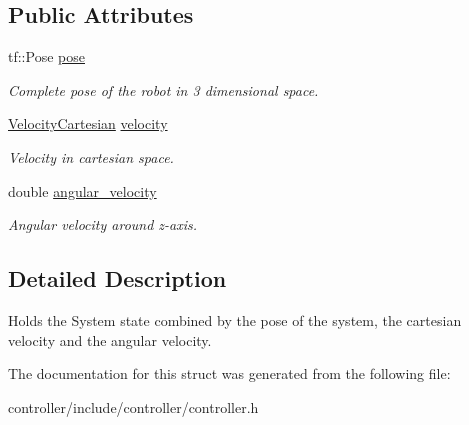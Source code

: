 \subsection*{Public Attributes}
\begin{DoxyCompactItemize}
\item 
tf\+::\+Pose \hyperlink{structController_1_1ControlState_a7c5ccd93c34234a339675a8882007972}{pose}\hypertarget{structController_1_1ControlState_a7c5ccd93c34234a339675a8882007972}{}\label{structController_1_1ControlState_a7c5ccd93c34234a339675a8882007972}

\begin{DoxyCompactList}\small\item\em Complete pose of the robot in 3 dimensional space. \end{DoxyCompactList}\item 
\hyperlink{classController_a7ab3d947ee649f6bac652de6a00e8148}{Velocity\+Cartesian} \hyperlink{structController_1_1ControlState_a3555392a901189a545630300a7b71e67}{velocity}\hypertarget{structController_1_1ControlState_a3555392a901189a545630300a7b71e67}{}\label{structController_1_1ControlState_a3555392a901189a545630300a7b71e67}

\begin{DoxyCompactList}\small\item\em Velocity in cartesian space. \end{DoxyCompactList}\item 
double \hyperlink{structController_1_1ControlState_acb345c317b7389a4553f28252a6f66b5}{angular\+\_\+velocity}\hypertarget{structController_1_1ControlState_acb345c317b7389a4553f28252a6f66b5}{}\label{structController_1_1ControlState_acb345c317b7389a4553f28252a6f66b5}

\begin{DoxyCompactList}\small\item\em Angular velocity around z-\/axis. \end{DoxyCompactList}\end{DoxyCompactItemize}


\subsection{Detailed Description}
Holds the System state combined by the pose of the system, the cartesian velocity and the angular velocity. 

The documentation for this struct was generated from the following file\+:\begin{DoxyCompactItemize}
\item 
controller/include/controller/controller.\+h\end{DoxyCompactItemize}
